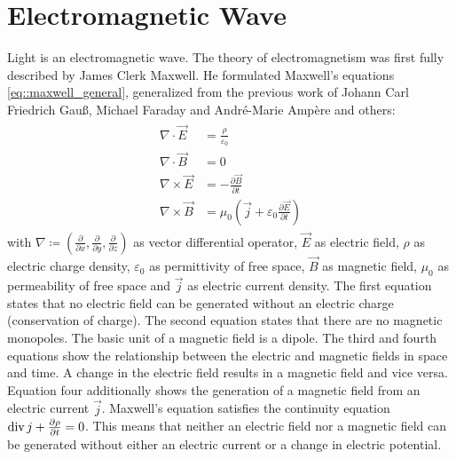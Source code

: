 \section{Electromagnetic Wave}
%
Light is an electromagnetic wave.
The theory of electromagnetism was first fully described by James Clerk Maxwell.
He formulated Maxwell's equations \cref{eq::maxwell_general}, generalized from the previous work of Johann Carl Friedrich Gau{\ss}, Michael Faraday and Andr\'{e}-Marie Amp\`{e}re and others:
%
\begin{align}
\begin{split} \label{eq::maxwell_general}
    \nabla \cdot \vec{E} &= \frac {\rho} {\varepsilon_0}\\
    \nabla \cdot \vec{B} &= 0\\
    \nabla \times \vec{E} &= -\frac{\partial \vec{B}} {\partial t}\\
    \nabla \times \vec{B} &= \mu_0 \left( \vec{j} + \varepsilon_0 \frac{\partial \vec{E}} {\partial t} \right)
\end{split}
\end{align}
%
with $\nabla \coloneqq \left({\frac{\partial}{\partial x}}, {\frac{\partial}{\partial y}}, {\frac{\partial}{\partial z}} \right)$ as vector differential operator, $\vec{E}$ as electric field, $\rho$ as electric charge density, $\varepsilon_0$ as permittivity of free space, $\vec{B}$ as magnetic field, $\mu_0$ as permeability of free space and $\vec{j}$ as electric current density.
%
The first equation states that no electric field can be generated without an electric charge (conservation of charge).
The second equation states that there are no magnetic monopoles.
The basic unit of a magnetic field is a dipole.
The third and fourth equations show the relationship between the electric and magnetic fields in space and time.
A change in the electric field results in a magnetic field and vice versa.
Equation four additionally shows the generation of a magnetic field from an electric current $\vec{j}$.
Maxwell's equation satisfies the continuity equation $\operatorname{div} j + \frac{\partial \rho}{\partial t} = 0$.
This means that neither an electric field nor a magnetic field can be generated without either an electric current or a change in electric potential.
%
%
